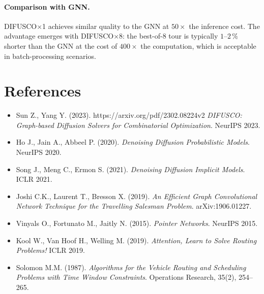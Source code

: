 \documentclass[12pt,a4paper]{article}
\begin{document}
\paragraph{Comparison with GNN.}
DIFUSCO$\times$1 achieves similar quality to the GNN at $50\times$ the
inference cost.
The advantage emerges with DIFUSCO$\times$8: the best-of-8 tour is typically
$1$--$2\,\%$ shorter than the GNN at the cost of $400\times$ the computation,
which is acceptable in batch-processing scenarios.

\section*{References}

\begin{itemize}[leftmargin=1.5em]
  \item Sun Z., Yang Y. (2023).
  https://arxiv.org/pdf/2302.08224v2
    \textit{DIFUSCO: Graph-based Diffusion Solvers for Combinatorial Optimization}.
    NeurIPS 2023.
  \item Ho J., Jain A., Abbeel P. (2020).
    \textit{Denoising Diffusion Probabilistic Models}.
    NeurIPS 2020.
  \item Song J., Meng C., Ermon S. (2021).
    \textit{Denoising Diffusion Implicit Models}.
    ICLR 2021.
  \item Joshi C.K., Laurent T., Bresson X. (2019).
    \textit{An Efficient Graph Convolutional Network Technique for the
    Travelling Salesman Problem}.
    arXiv:1906.01227.
  \item Vinyals O., Fortunato M., Jaitly N. (2015).
    \textit{Pointer Networks}.
    NeurIPS 2015.
  \item Kool W., Van Hoof H., Welling M. (2019).
    \textit{Attention, Learn to Solve Routing Problems!}
    ICLR 2019.
  \item Solomon M.M. (1987).
    \textit{Algorithms for the Vehicle Routing and Scheduling Problems with
    Time Window Constraints}.
    Operations Research, 35(2), 254--265.
\end{itemize}
\end{document}
